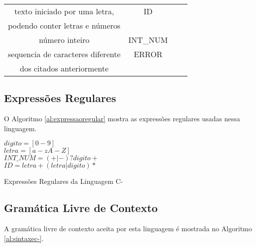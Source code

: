 \begin{table}[!htb]
\begin{tabular}{|c|c|c|c|}
		texto iniciado por uma letra,                    &   ID\\
		podendo conter letras e números  & \\ 
		\hline
		número inteiro    & 					                               INT\_NUM\\
		\hline
		
		sequencia de caracteres diferente   &                   ERROR\\
		dos citados anteriormente             &       \\
		\hline
		
	\end{tabular}
	
\end{table}



\subsection{Expressões Regulares}

O Algoritmo \ref{al:expressaoregular} mostra as expressões regulares usadas nessa linguagem.

\clearpage

\begin{algorithm}

	\begin{center}
		$digito = [0-9]$ \\
		$letra = [a-zA-Z]$ \\
		$INT\_NUM = (+|-)? digito+$\\
		$ID = letra+ (letra|digito)*$\\
	\end{center}
	
	\caption{Expressões Regulares da Linguagem C-}
	\label{al:expressaoregular}
\end{algorithm}


\subsection{Gramática Livre de Contexto}

A gramática livre de contexto aceita por esta linguagem é mostrada no Algoritmo \ref{al:sintaxec-}.

